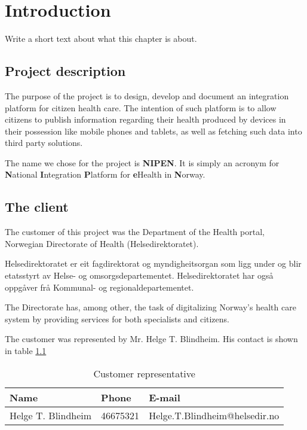 \chapter{Introduction} 
\label{Introduction} 

Write a short text about what this chapter is about.
\section{Project description}

The purpose of the project is to design, develop and document an integration platform for citizen health care.
The intention of such platform is to allow citizens to publish information regarding their health produced by devices in their possession like mobile phones and tablets, as well as fetching such data into third party solutions.

The name we chose for the project is \textbf{NIPEN}. It is simply an acronym for \textbf{N}ational \textbf{I}ntegration \textbf{P}latform for \textbf{e}Health in \textbf{N}orway.


\section{The client}
The customer of this project was the Department of the Health portal, Norwegian Directorate of Health (Helsedirektoratet).

Helsedirektoratet er eit fagdirektorat og myndigheitsorgan som ligg under og blir etatsstyrt av Helse- og omsorgsdepartementet. Helsedirektoratet har også oppgåver frå Kommunal- og regionaldepartementet.

The Directorate has, among other, the task of digitalizing Norway's health care system by providing services for both specialists and citizens.

The customer was represented by Mr. Helge T. Blindheim. His contact is shown in table \ref{table:client}


\begin{table}
\begin{center}
\begin{tabular}{ l | l | l }
  \hline
  Name & Phone & E-mail \\
  \hline\noalign{\smallskip}\noalign{\smallskip}\hline
  Helge T. Blindheim	& 46675321 & Helge.T.Blindheim@helsedir.no \\
  \hline
\end{tabular}
\end{center}
\caption{Customer representative}
\label{table:client}
\end{table}


